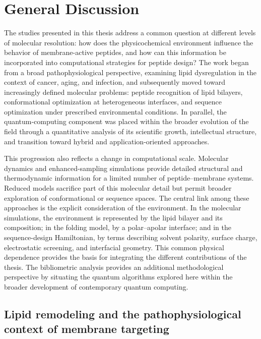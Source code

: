 \chapter{General Discussion}\label{discussion}

\newpage

The studies presented in this thesis address a common question at different levels of molecular resolution: how does the physicochemical environment influence the behavior of membrane-active peptides, and how can this information be incorporated into computational strategies for peptide design? The work began from a broad pathophysiological perspective, examining lipid dysregulation in the context of cancer, aging, and infection, and subsequently moved toward increasingly defined molecular problems: peptide recognition of lipid bilayers, conformational optimization at heterogeneous interfaces, and sequence optimization under prescribed environmental conditions. In parallel, the quantum-computing component was placed within the broader evolution of the field through a quantitative analysis of its scientific growth, intellectual structure, and transition toward hybrid and application-oriented approaches.

This progression also reflects a change in computational scale. Molecular dynamics and enhanced-sampling simulations provide detailed structural and thermodynamic information for a limited number of peptide--membrane systems. Reduced models sacrifice part of this molecular detail but permit broader exploration of conformational or sequence spaces. The central link among these approaches is the explicit consideration of the environment. In the molecular simulations, the environment is represented by the lipid bilayer and its composition; in the folding model, by a polar--apolar interface; and in the sequence-design Hamiltonian, by terms describing solvent polarity, surface charge, electrostatic screening, and interfacial geometry. This common physical dependence provides the basis for integrating the different contributions of the thesis. The bibliometric analysis provides an additional methodological perspective by situating the quantum algorithms explored here within the broader development of contemporary quantum computing.


\section{Lipid remodeling and the pathophysiological context of membrane targeting}

